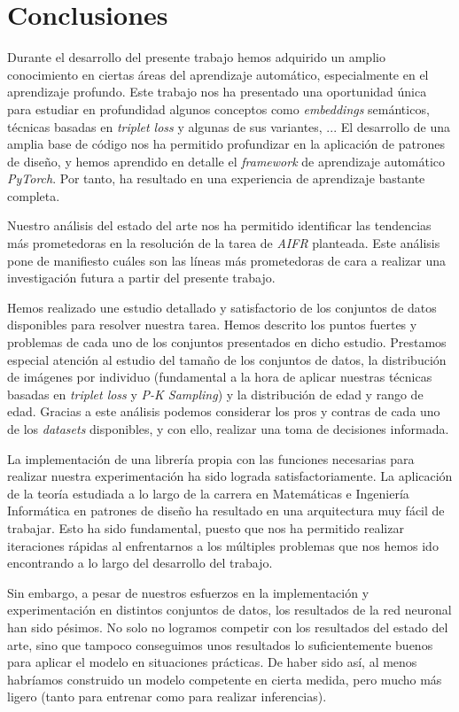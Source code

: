 \chapter{Conclusiones} \label{ich:conclusiones}

Durante el desarrollo del presente trabajo hemos adquirido un amplio conocimiento en ciertas áreas del aprendizaje automático, especialmente en el aprendizaje profundo. Este trabajo nos ha presentado una oportunidad única para estudiar en profundidad algunos conceptos como \textit{embeddings} semánticos, técnicas basadas en \textit{triplet loss} y algunas de sus variantes, ... El desarrollo de una amplia base de código nos ha permitido profundizar en la aplicación de patrones de diseño, y hemos aprendido en detalle el \textit{framework} de aprendizaje automático \textit{PyTorch}. Por tanto, ha resultado en una experiencia de aprendizaje bastante completa.

Nuestro análisis del estado del arte nos ha permitido identificar las tendencias más prometedoras en la resolución de la tarea de \textit{AIFR} planteada. Este análisis pone de manifiesto cuáles son las líneas más prometedoras de cara a realizar una investigación futura a partir del presente trabajo.

Hemos realizado une estudio detallado y satisfactorio  de los conjuntos de datos disponibles para resolver nuestra tarea. Hemos descrito los puntos fuertes y problemas de cada uno de los conjuntos presentados en dicho estudio. Prestamos especial atención al estudio del tamaño de los conjuntos de datos, la distribución de imágenes por individuo (fundamental a la hora de aplicar nuestras técnicas basadas en \textit{triplet loss} y \textit{P-K Sampling}) y la distribución de edad y rango de edad. Gracias a este análisis podemos considerar los pros y contras de cada uno de los \textit{datasets} disponibles, y con ello, realizar una toma de decisiones informada.

La implementación de una librería propia con las funciones necesarias para realizar nuestra experimentación ha sido lograda satisfactoriamente. La aplicación de la teoría estudiada a lo largo de la carrera en Matemáticas e Ingeniería Informática en patrones de diseño ha resultado en una arquitectura muy fácil de trabajar. Esto ha sido fundamental, puesto que nos ha permitido realizar iteraciones rápidas al enfrentarnos a los múltiples problemas que nos hemos ido encontrando a lo largo del desarrollo del trabajo.

Sin embargo, a pesar de nuestros esfuerzos en la implementación y experimentación en distintos conjuntos de datos, los resultados de la red neuronal han sido pésimos. No solo no logramos competir con los resultados del estado del arte, sino que tampoco conseguimos unos resultados lo suficientemente buenos para aplicar el modelo en situaciones prácticas. De haber sido así, al menos habríamos construido un modelo competente en cierta medida, pero mucho más ligero (tanto para entrenar como para realizar inferencias).

